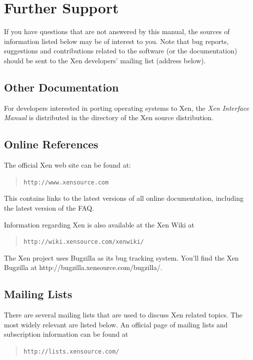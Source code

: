 \documentclass[11pt,twoside,final,openright]{report}
\begin{document}
\chapter{Further Support}

If you have questions that are not answered by this manual, the
sources of information listed below may be of interest to you.  Note
that bug reports, suggestions and contributions related to the
software (or the documentation) should be sent to the Xen developers'
mailing list (address below).


\section{Other Documentation}

For developers interested in porting operating systems to Xen, the
\emph{Xen Interface Manual} is distributed in the 
directory of the Xen source distribution.


\section{Online References}

The official Xen web site can be found at:
\begin{quote} {\tt http://www.xensource.com}
\end{quote}

This contains links to the latest versions of all online
documentation, including the latest version of the FAQ.

Information regarding Xen is also available at the Xen Wiki at
\begin{quote} {\tt http://wiki.xensource.com/xenwiki/}\end{quote}
The Xen project uses Bugzilla as its bug tracking system. You'll find
the Xen Bugzilla at http://bugzilla.xensource.com/bugzilla/.


\section{Mailing Lists}

There are several mailing lists that are used to discuss Xen related
topics. The most widely relevant are listed below. An official page of
mailing lists and subscription information can be found at \begin{quote}
  {\tt http://lists.xensource.com/} \end{quote}
\end{document}
